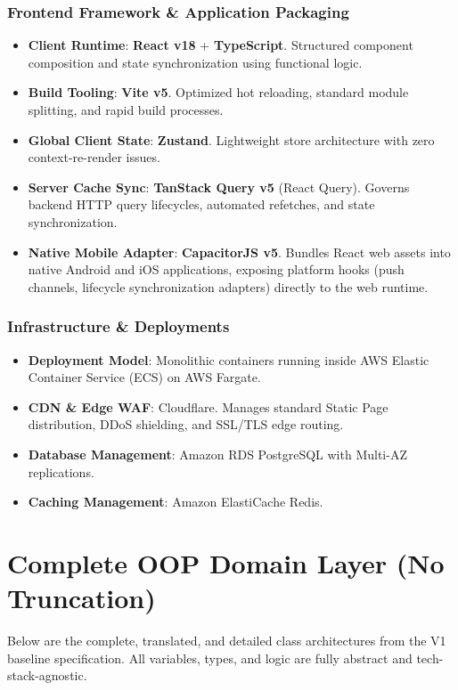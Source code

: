 \documentclass[11pt,a4paper]{report}
\begin{document}
\subsection{Frontend Framework \& Application Packaging}
\begin{itemize}
    \item \textbf{Client Runtime}: \textbf{React v18} + \textbf{TypeScript}. Structured component composition and state synchronization using functional logic.
    \item \textbf{Build Tooling}: \textbf{Vite v5}. Optimized hot reloading, standard module splitting, and rapid build processes.
    \item \textbf{Global Client State}: \textbf{Zustand}. Lightweight store architecture with zero context-re-render issues.
    \item \textbf{Server Cache Sync}: \textbf{TanStack Query v5} (React Query). Governs backend HTTP query lifecycles, automated refetches, and state synchronization.
    \item \textbf{Native Mobile Adapter}: \textbf{CapacitorJS v5}. Bundles React web assets into native Android and iOS applications, exposing platform hooks (push channels, lifecycle synchronization adapters) directly to the web runtime.
\end{itemize}

\subsection{Infrastructure \& Deployments}
\begin{itemize}
    \item \textbf{Deployment Model}: Monolithic containers running inside AWS Elastic Container Service (ECS) on AWS Fargate.
    \item \textbf{CDN \& Edge WAF}: Cloudflare. Manages standard Static Page distribution, DDoS shielding, and SSL/TLS edge routing.
    \item \textbf{Database Management}: Amazon RDS PostgreSQL with Multi-AZ replications.
    \item \textbf{Caching Management}: Amazon ElastiCache Redis.
\end{itemize}


\chapter{Complete OOP Domain Layer (No Truncation)}


Below are the complete, translated, and detailed class architectures from the V1 baseline specification. All variables, types, and logic are fully abstract and tech-stack-agnostic.
\end{document}
